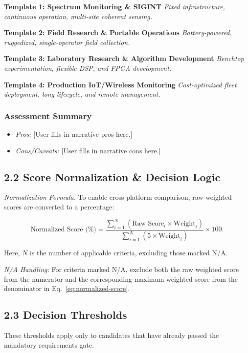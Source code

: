 \documentclass[11pt,a4paper]{article}
\newcommand{\templatedesc}[2]{\noindent\textbf{#1} \textit{#2}\par}
\begin{document}
\templatedesc{Template 1: Spectrum Monitoring \& SIGINT}{Fixed infrastructure, continuous operation, multi-site coherent sensing.}
\templatedesc{Template 2: Field Research \& Portable Operations}{Battery-powered, ruggedized, single-operator field collection.}
\templatedesc{Template 3: Laboratory Research \& Algorithm Development}{Benchtop experimentation, flexible DSP, and FPGA development.}
\templatedesc{Template 4: Production IoT/Wireless Monitoring}{Cost-optimized fleet deployment, long lifecycle, and remote management.}

\subsubsection*{Assessment Summary}

\begin{itemize}
  \item \textit{Pros:} [User fills in narrative pros here.]
  \item \textit{Cons/Caveats:} [User fills in narrative cons here.]
\end{itemize}

\subsection*{2.2 Score Normalization \& Decision Logic}

\textit{Normalization Formula.} To enable cross-platform comparison, raw weighted scores are converted to a percentage:

\begin{equation}
\label{eq:normalized-score}
\text{Normalized Score (\%)} =
\frac{\sum_{i=1}^{N} \left(\text{Raw Score}_i \times \text{Weight}_i\right)}
{\sum_{i=1}^{N} \left(5 \times \text{Weight}_i\right)} \times 100.
\end{equation}

Here, $N$ is the number of applicable criteria, excluding those marked N/A.

\noindent\textit{N/A Handling:} For criteria marked N/A, exclude both the raw weighted score from the numerator and the corresponding maximum weighted score from the denominator in Eq.~\eqref{eq:normalized-score}.

\subsection*{2.3 Decision Thresholds}

These thresholds apply only to candidates that have already passed the mandatory requirements gate.
\end{document}
